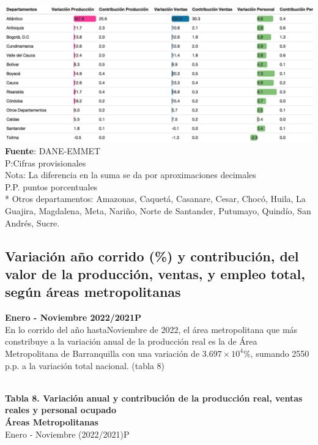 \documentclass[
]{article}
\begin{document}
\includegraphics{boletin_files/figure-latex/tabla7_view-1.png}
\textbf{Fuente}: DANE-EMMET\\
P:Cifras provisionales\\
Nota: La diferencia en la suma se da por aproximaciones decimales\\
P.P. puntos porcentuales\\
* Otros departamentos: Amazonas, Caquetá, Casanare, Cesar, Chocó, Huila,
La Guajira, Magdalena, Meta, Nariño, Norte de Santander, Putumayo,
Quindío, San Andrés, Sucre.\\

\hypertarget{variaciuxf3n-auxf1o-corrido-y-contribuciuxf3n-del-valor-de-la-producciuxf3n-ventas-y-empleo-total-seguxfan-uxe1reas-metropolitanas}{%
\subsection{Variación año corrido (\%) y contribución, del valor de la
producción, ventas, y empleo total, según áreas
metropolitanas}\label{variaciuxf3n-auxf1o-corrido-y-contribuciuxf3n-del-valor-de-la-producciuxf3n-ventas-y-empleo-total-seguxfan-uxe1reas-metropolitanas}}

\textbf{Enero - Noviembre 2022/2021P}\\

En lo corrido del año hastaNoviembre de 2022, el área metropolitana que
más constribuye a la variación anual de la producción real es la de Área
Metropolitana de Barranquilla con una variación de
\ensuremath{3.697\times 10^{4}}\%, sumando 2550 p.p. a la variación
total nacional. (tabla 8)\\
\strut \\

\textbf{Tabla 8. Variación anual y contribución de la producción real,
ventas reales y personal ocupado}\\
\textbf{Áreas Metropolitanas}\\
Enero - Noviembre (2022/2021)P\\
\end{document}
